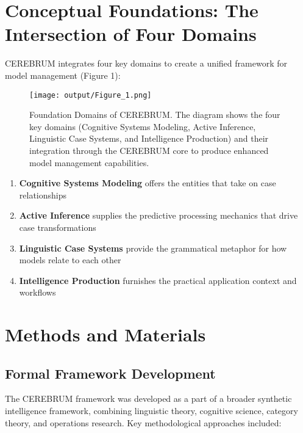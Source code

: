 \hypertarget{conceptual-foundations-the-intersection-of-four-domains}{%
\section{Conceptual Foundations: The Intersection of Four
Domains}\label{conceptual-foundations-the-intersection-of-four-domains}}

CEREBRUM integrates four key domains to create a unified framework for
model management (Figure 1):

\begin{figure}
\centering
\texttt{[image: output/Figure\_1.png]}
\caption{Foundation Domains of CEREBRUM. The diagram shows the four key
domains (Cognitive Systems Modeling, Active Inference, Linguistic Case
Systems, and Intelligence Production) and their integration through the
CEREBRUM core to produce enhanced model management capabilities.}
\end{figure}

\begin{enumerate}
\def\labelenumi{\arabic{enumi}.}
\tightlist
\item
  \textbf{Cognitive Systems Modeling} offers the entities that take on
  case relationships
\item
  \textbf{Active Inference} supplies the predictive processing mechanics
  that drive case transformations
\item
  \textbf{Linguistic Case Systems} provide the grammatical metaphor for
  how models relate to each other
\item
  \textbf{Intelligence Production} furnishes the practical application
  context and workflows
\end{enumerate}

\hypertarget{methods-and-materials}{%
\section{Methods and Materials}\label{methods-and-materials}}

\hypertarget{formal-framework-development}{%
\subsection{Formal Framework
Development}\label{formal-framework-development}}

The CEREBRUM framework was developed as a part of a broader synthetic
intelligence framework, combining linguistic theory, cognitive science,
category theory, and operations research. Key methodological approaches
included:

